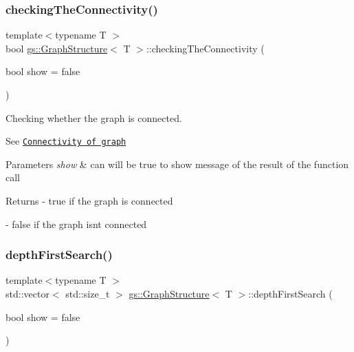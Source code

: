 \subsubsection{\texorpdfstring{checking\+The\+Connectivity()}{checkingTheConnectivity()}}
{\footnotesize\ttfamily template$<$typename T $>$ \\
bool \mbox{\hyperlink{classgs_1_1_graph_structure}{gs\+::\+Graph\+Structure}}$<$ T $>$\+::checking\+The\+Connectivity (\begin{DoxyParamCaption}\item[{bool}]{show = {\ttfamily false} }\end{DoxyParamCaption})}



Checking whether the graph is connected. 

See \href{https://en.wikipedia.org/w/index.php?search=Connectivity+graph+theory&title=Special%3ASearch&fulltext=1&ns0=1}{\tt Connectivity of graph} 
\begin{DoxyParams}{Parameters}
{\em show} & can will be true to show message of the result of the function call \\
\hline
\end{DoxyParams}
\begin{DoxyReturn}{Returns}
-\/ true if the graph is connected 

-\/ false if the graph isn\textquotesingle{}t connected 
\end{DoxyReturn}
\mbox{\label{classgs_1_1_graph_structure_a6a9516f3f46cbbcdc50741e342a22ae4}} 
\subsubsection{\texorpdfstring{depth\+First\+Search()}{depthFirstSearch()}}
{\footnotesize\ttfamily template$<$typename T $>$ \\
std\+::vector$<$ std\+::size\+\_\+t $>$ \mbox{\hyperlink{classgs_1_1_graph_structure}{gs\+::\+Graph\+Structure}}$<$ T $>$\+::depth\+First\+Search (\begin{DoxyParamCaption}\item[{bool}]{show = {\ttfamily false} }\end{DoxyParamCaption})}




